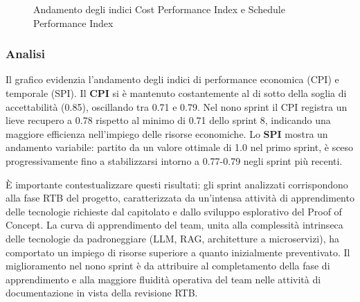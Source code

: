 \documentclass[a4paper,11pt,oneside]{scrartcl}
\begin{document}
\begin{figure}[H]
\centering
{}
\caption{Andamento degli indici Cost Performance Index e Schedule Performance Index}
\label{fig:cpi_spi}
\end{figure}

\subsubsection*{Analisi}

Il grafico evidenzia l'andamento degli indici di performance economica (CPI) e temporale (SPI). Il \textbf{CPI} si è mantenuto costantemente al di sotto della soglia di accettabilità (0.85), oscillando tra 0.71 e 0.79. Nel nono sprint il CPI registra un lieve recupero a 0.78 rispetto al minimo di 0.71 dello sprint 8, indicando una maggiore efficienza nell'impiego delle risorse economiche. Lo \textbf{SPI} mostra un andamento variabile: partito da un valore ottimale di 1.0 nel primo sprint, è sceso progressivamente fino a stabilizzarsi intorno a 0.77-0.79 negli sprint più recenti.

È importante contestualizzare questi risultati: gli sprint analizzati corrispondono alla fase RTB{\scriptsize{}} del progetto, caratterizzata da un'intensa attività di apprendimento delle tecnologie richieste dal capitolato e dallo sviluppo esplorativo del Proof of Concept. La curva di apprendimento del team, unita alla complessità intrinseca delle tecnologie da padroneggiare (LLM{\scriptsize{}}, RAG{\scriptsize{}}, architetture a microservizi{\scriptsize{}}), ha comportato un impiego di risorse superiore a quanto inizialmente preventivato. Il miglioramento nel nono sprint è da attribuire al completamento della fase di apprendimento e alla maggiore fluidità operativa del team nelle attività di documentazione in vista della revisione RTB.
\end{document}
